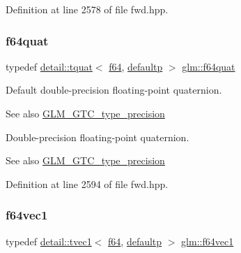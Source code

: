 Definition at line 2578 of file fwd.\+hpp.

\mbox{\label{group__gtc__type__precision_ga860589eddc4ff95795a858318652b6ff}} 
\subsubsection{\texorpdfstring{f64quat}{f64quat}}
{\footnotesize\ttfamily typedef \hyperlink{structglm_1_1detail_1_1tquat}{detail\+::tquat}$<$ \hyperlink{group__gtc__type__precision_ga2bba392e555124b36cde6abba349bab3}{f64}, \hyperlink{namespaceglm_a0f04f086094c747d227af4425893f545a9d21ccd8b5a009ec7eb7677befc3bf51}{defaultp} $>$ \hyperlink{group__gtc__type__precision_ga860589eddc4ff95795a858318652b6ff}{glm\+::f64quat}}

Default double-\/precision floating-\/point quaternion. \begin{DoxySeeAlso}{See also}
\hyperlink{group__gtc__type__precision}{G\+L\+M\+\_\+\+G\+T\+C\+\_\+type\+\_\+precision}
\end{DoxySeeAlso}
Double-\/precision floating-\/point quaternion. \begin{DoxySeeAlso}{See also}
\hyperlink{group__gtc__type__precision}{G\+L\+M\+\_\+\+G\+T\+C\+\_\+type\+\_\+precision} 
\end{DoxySeeAlso}


Definition at line 2594 of file fwd.\+hpp.

\mbox{\label{group__gtc__type__precision_ga55bdb96a24de2e3531c74310b12ba5d7}} 
\subsubsection{\texorpdfstring{f64vec1}{f64vec1}}
{\footnotesize\ttfamily typedef \hyperlink{structglm_1_1detail_1_1tvec1}{detail\+::tvec1}$<$ \hyperlink{group__gtc__type__precision_ga2bba392e555124b36cde6abba349bab3}{f64}, \hyperlink{namespaceglm_a0f04f086094c747d227af4425893f545a9d21ccd8b5a009ec7eb7677befc3bf51}{defaultp} $>$ \hyperlink{group__gtc__type__precision_ga55bdb96a24de2e3531c74310b12ba5d7}{glm\+::f64vec1}}

